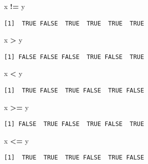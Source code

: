 \documentclass[
  11pt,
]{krantz}
\newenvironment{Shaded}{\begin{snugshade}}{\end{snugshade}}
\newcommand{\NormalTok}[1]{#1}
\newcommand{\OperatorTok}[1]{\textcolor[rgb]{0.43,0.43,0.43}{\textbf{#1}}}
\newcommand{\StringTok}[1]{\textcolor[rgb]{0.5,0.5,0.5}{#1}}
\begin{document}
\begin{Shaded}
\begin{Highlighting}[]
\NormalTok{x }\OperatorTok{!=}\StringTok{ }\NormalTok{y}
\end{Highlighting}
\end{Shaded}

\begin{verbatim}
[1]  TRUE FALSE  TRUE  TRUE  TRUE  TRUE
\end{verbatim}

\begin{Shaded}
\begin{Highlighting}[]
\NormalTok{x }\OperatorTok{>}\StringTok{ }\NormalTok{y}
\end{Highlighting}
\end{Shaded}

\begin{verbatim}
[1] FALSE FALSE FALSE  TRUE FALSE  TRUE
\end{verbatim}

\begin{Shaded}
\begin{Highlighting}[]
\NormalTok{x }\OperatorTok{<}\StringTok{ }\NormalTok{y}
\end{Highlighting}
\end{Shaded}

\begin{verbatim}
[1]  TRUE FALSE  TRUE FALSE  TRUE FALSE
\end{verbatim}

\begin{Shaded}
\begin{Highlighting}[]
\NormalTok{x }\OperatorTok{>=}\StringTok{ }\NormalTok{y}
\end{Highlighting}
\end{Shaded}

\begin{verbatim}
[1] FALSE  TRUE FALSE  TRUE FALSE  TRUE
\end{verbatim}

\begin{Shaded}
\begin{Highlighting}[]
\NormalTok{x }\OperatorTok{<=}\StringTok{ }\NormalTok{y}
\end{Highlighting}
\end{Shaded}

\begin{verbatim}
[1]  TRUE  TRUE  TRUE FALSE  TRUE FALSE
\end{verbatim}
\end{document}
